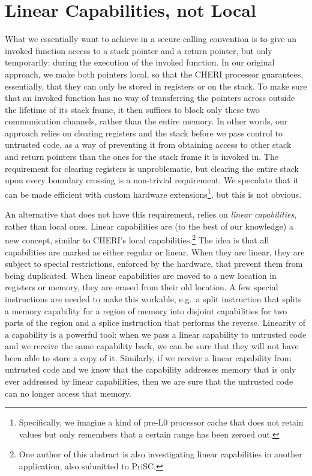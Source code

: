 \documentclass[sigplan, review]{acmart}
\begin{document}
\section{Linear Capabilities, not Local}
What we essentially want to achieve in a secure calling convention is to give an invoked function access to a stack pointer and a return pointer, but only temporarily: during the execution of the invoked function. 
In our original approach, we make both pointers local, so that the CHERI processor guarantees, essentially, that they can only be stored in registers or on the stack.
To make sure that an invoked function has no way of transferring the pointers across outside the lifetime of its stack frame, it then suffices to block only these two communication channels, rather than the entire memory.
In other words, our approach relies on clearing registers and the stack before we pass control to untrusted code, as a way of preventing it from obtaining access to other stack and return pointers than the ones for the stack frame it is invoked in.
The requirement for clearing registers is unproblematic, but clearing the entire stack upon every boundary crossing is a non-trivial requirement.
We speculate that it can be made efficient with custom hardware extensions\footnote{Specifically, we imagine a kind of pre-L0 processor cache that does not retain values but only remembers that a certain range has been zeroed out.}, but this is not obvious.

An alternative that does not have this requirement, relies on \emph{linear capabilities}, rather than local ones.
Linear capabilities are (to the best of our knowledge) a new concept, similar to CHERI's local capabilities.\footnote{One author of this abstract is also investigating linear capabilities in another application, also submitted to PriSC.}
The idea is that all capabilities are marked as either regular or linear.
When they are linear, they are subject to special restrictions, enforced by the hardware, that prevent them from being duplicated.
When linear capabilities are moved to a new location in registers or memory, they are erased from their old location.
A few special instructions are needed to make this workable, e.g.\ a split instruction that splits a memory capability for a region of memory into disjoint capabilities for two parts of the region and a splice instruction that performs the reverse.
Linearity of a capability is a powerful tool: when we pass a linear capability to untrusted code and we receive the same capability back, we can be sure that they will not have been able to store a copy of it.
Similarly, if we receive a linear capability from untrusted code and we know that the capability addresses memory that is only ever addressed by linear capabilities, then we are sure that the untrusted code can no longer access that memory.
\end{document}
